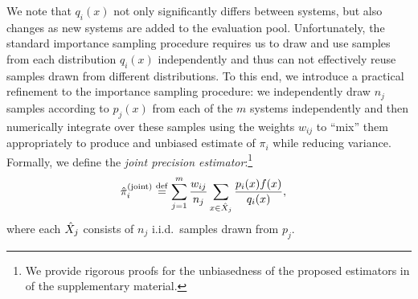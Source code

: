 We note that $q_i(x)$ not only significantly differs between systems, but also changes as new systems are added to the evaluation pool.
Unfortunately, the standard importance sampling procedure requires us to draw and use samples from each distribution $q_i(x)$ independently and thus can not effectively reuse samples drawn from different distributions.
To this end, we introduce a practical refinement to the importance sampling procedure:
we independently draw $n_j$ samples according to $p_j(x)$ from each of the $m$ systems independently 
and then numerically integrate over these samples using the weights $w_{ij}$ to ``mix'' them appropriately to produce and unbiased estimate of $\pi_i$ while reducing variance.
Formally, we define the \emph{joint precision estimator}:\footnote{We provide rigorous proofs for the
unbiasedness of the proposed estimators in  of the
supplementary material.}
\begin{align}
  {\hat{\pi}}_i^{\text{(joint)}} &\stackrel{\rm def}{=} \sum_{j=1}^m \frac{w_{ij}}{n_{j}} \sum_{x \in {\hat{X}}_j} \frac{p_i(x) f(x)}{q_i(x)},
\end{align}
where each ${\hat{X}}_j$ consists of $n_j$ i.i.d.~samples drawn from $p_j$.



